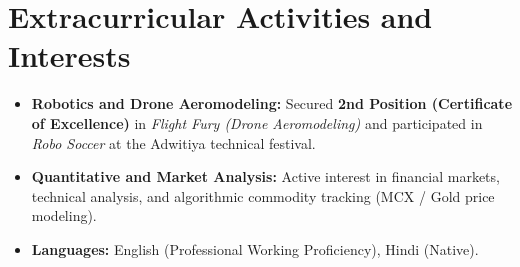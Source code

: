 \documentclass[letterpaper,10pt]{article}
\newcommand{\resumeItem}[1]{
  \item\small{
    {#1 \vspace{-2pt}}
  }
}
\newcommand{\resumeSubHeadingListStart}{\begin{itemize}[leftmargin=0.15in, label={}]}
\newcommand{\resumeSubHeadingListEnd}{\end{itemize}}
\begin{document}
\section{Extracurricular Activities and Interests}
  \resumeSubHeadingListStart
    \resumeItem{\textbf{Robotics and Drone Aeromodeling:} Secured \textbf{2nd Position (Certificate of Excellence)} in \emph{Flight Fury (Drone Aeromodeling)} and participated in \emph{Robo Soccer} at the Adwitiya technical festival.}
    \resumeItem{\textbf{Quantitative and Market Analysis:} Active interest in financial markets, technical analysis, and algorithmic commodity tracking (MCX / Gold price modeling).}
    \resumeItem{\textbf{Languages:} English (Professional Working Proficiency), Hindi (Native).}
  \resumeSubHeadingListEnd
\end{document}
